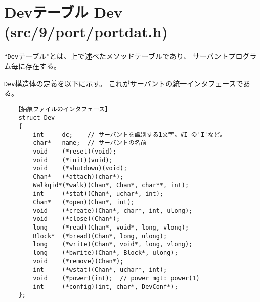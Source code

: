 {\begin{comment}
\begin{itemize}
\item  全てのサーバントは同一のメソッドインタフェースをもつ。
\item  サーバントプログラムはクラス定義に相当し、各メソッドコードを持つ。
\item  各メソッドは、メソッドテーブル経由で呼ばれる。
\item  ``抽象ファイル''は、インスタンスオブジェクト(抽象ファイルオブジェクト)である。
\item  抽象ファイルオブジェクトは、サーバントの名前空間に載っている。
\item  抽象ファイルオブジェクトは、Qidと言う値により、サーバント内でユニークに識別される。
       Qid は Unix の inode番号に相当する。
\item {\bf 一般のオブジェクト指向と違って、同一サーバント(クラス)内でも
           抽象ファイルオブジェクトのデータ構成は同一とは限らない。
           各メソッドは抽象ファイルオブジェクトのQidから、そのデータ構成を判定し、
           対応した処理を行う。}
\item   抽象ファイルオブジェクトを{\tt open()} すると、
       LP49core内では ``Chanテーブル''(後で詳しく述べる)が割り当てられ、
       サーバントのメソッドテーブルへの識別情報と
       抽象ファイルオブジェクトの Qid などが設定される。
       つまり、Chanテーブルはオブジェクトハンドルとして機能する。
\end{itemize}
\end{comment}


\section{Devテーブル Dev (src/9/port/portdat.h)}


``{\tt Dev}テーブル''とは、上で述べたメソッドテーブルであり、
サーバントプログラム毎に存在する。

{\tt Dev}構造体の定義を以下に示す。
これがサーバントの統一インタフェースである。

{\small
\begin{verbatim}
   【抽象ファイルのインタフェース】
    struct Dev
    {
        int     dc;    // サーバントを識別する1文字。#I の'I'など。
        char*   name;  // サーバントの名前
        void    (*reset)(void);
        void    (*init)(void);
        void    (*shutdown)(void);
        Chan*   (*attach)(char*);
        Walkqid*(*walk)(Chan*, Chan*, char**, int);
        int     (*stat)(Chan*, uchar*, int);
        Chan*   (*open)(Chan*, int);
        void    (*create)(Chan*, char*, int, ulong);
        void    (*close)(Chan*);
        long    (*read)(Chan*, void*, long, vlong);
        Block*  (*bread)(Chan*, long, ulong);
        long    (*write)(Chan*, void*, long, vlong);
        long    (*bwrite)(Chan*, Block*, ulong);
        void    (*remove)(Chan*);
        int     (*wstat)(Chan*, uchar*, int);
        void    (*power)(int);  // power mgt: power(1) 
        int     (*config)(int, char*, DevConf*); 
    };
\end{verbatim}
}

}
